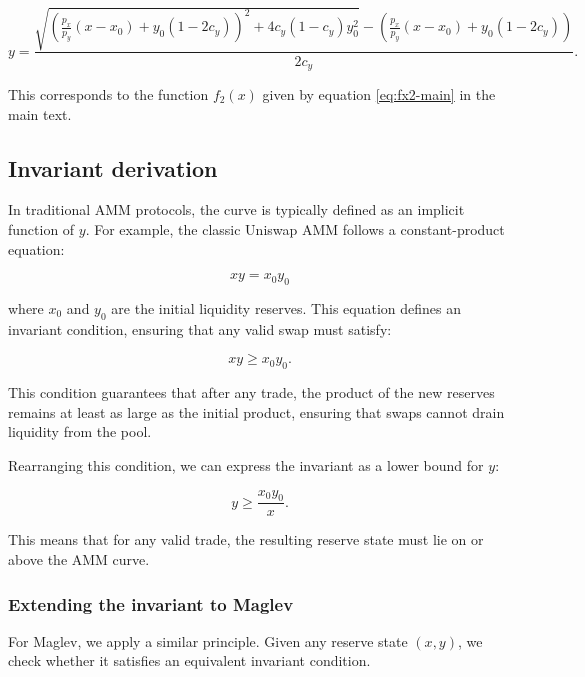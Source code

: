 \documentclass{article}
\begin{document}
\begin{equation}
    \label{eq:maglev-2}
    y = \frac{
        \sqrt{
            \left( \frac{p_x}{p_y} (x - x_0) + y_0 (1 - 2c_y) \right)^2 
            + 4c_y (1 - c_y) y_0^2
        } 
        - \left( \frac{p_x}{p_y} (x - x_0) + y_0 (1 - 2c_y) \right)
    }{2c_y}.
\end{equation}

This corresponds to the function \( f_2(x) \) given by equation \eqref{eq:fx2-main} in the main text.

\subsection{Invariant derivation}
\label{sec:invariant-derivation}

In traditional AMM protocols, the curve is typically defined as an implicit function of $y$. For example, the classic Uniswap AMM follows a constant-product equation:

\begin{equation}
    xy = x_0 y_0
\end{equation}

where $x_0$ and $y_0$ are the initial liquidity reserves. This equation defines an invariant condition, ensuring that any valid swap must satisfy:

\begin{equation}
    xy \geq x_0 y_0.
\end{equation}

This condition guarantees that after any trade, the product of the new reserves remains at least as large as the initial product, ensuring that swaps cannot drain liquidity from the pool.

Rearranging this condition, we can express the invariant as a lower bound for $y$:

\begin{equation}
    y \geq \frac{x_0 y_0}{x}.
\end{equation}

This means that for any valid trade, the resulting reserve state must lie on or above the AMM curve.  

\subsubsection{Extending the invariant to Maglev}

For Maglev, we apply a similar principle. Given any reserve state $(x, y)$, we check whether it satisfies an equivalent invariant condition.
\end{document}
